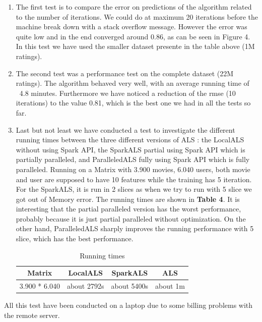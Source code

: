 \documentclass{sig-alternate-05-2015}
\begin{document}
\begin{enumerate}
    \item The first test is to compare the error on predictions of the algorithm related to the number of iterations.
        We could do at maximum 20 iterations before the machine break down with a stack overflow message. However the error
        was quite low and in the end converged around 0.86, as can be seen in Figure 4. In this test we have used the smaller
        dataset presente in the table above (1M ratings).
    \item The second test was a performance test on the complete dataset (22M ratings). The algorithm behaved very well, with an average
    running time of ~4.8 minutes. Furthermore we have noticed a reduction of the rmse (10 iterations) to the value 0.81, which is the best one
    we had in all the tests so far.
    \item Last but not least we have conducted a test to investigate the different running times between the three different versions of ALS : the LocalALS without using Spark API, the SparkALS partial using Spark API which is partially paralleled, and ParalleledALS fully using Spark API which is fully paralleled. Running on a Matrix with 3.900 movies, 6.040 users, both movie and user are supposed to have 10 features while the training has 5 iteration. For the SparkALS, it is run in 2 slices as when we try to run with 5 slice we got out of Memory error. The running times are shown in \textbf{Table 4}. It is interesting that the partial paralleled version has the worst performance, probably because it is just partial paralleled without optimization. On the other hand, ParalleledALS sharply improves the running performance with 5 slice, which has the best performance.
\begin{table}
\centering
\caption{Running times}
\begin{tabular}{|c|c|c|c|} \hline
\textbf{Matrix}  & \textbf{LocalALS} & \textbf{SparkALS} & \textbf{ALS }\\ \hline
3.900 * 6.040 & about 2792s  & about 5400s & about 1m\\ \hline
\end{tabular}
\end{table}
\end{enumerate}
All this test have been conducted on a laptop due to some billing problems with the remote server.
\end{document}
